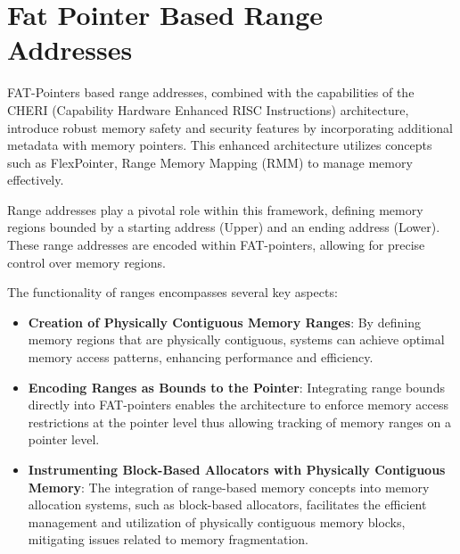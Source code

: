 \chapter{Fat Pointer Based Range Addresses}

\ifpdf
    \graphicspath{{Fat-Pointer-Based-Range-Address/Figs/Raster/}{Fat-Pointer-Based-Range-Address/Figs/PDF/}{Fat-Pointer-Based-Range-Address/Figs/}}
\else
    \graphicspath{{Fat-Pointer-Based-Range-Address/Figs/Vector/}{Fat-Pointer-Based-Range-Address/Figs/}}
\fi


FAT-Pointers based range addresses, combined with the capabilities of the CHERI (Capability Hardware Enhanced RISC Instructions) 
architecture, introduce robust memory safety and security features by incorporating additional metadata 
with memory pointers. This enhanced architecture utilizes concepts such as FlexPointer, 
Range Memory Mapping (RMM) to manage memory effectively.

Range addresses play a pivotal role within this framework, defining memory 
regions bounded by a starting address (Upper) and an ending address (Lower). 
These range addresses are encoded within FAT-pointers, allowing for precise 
control over memory regions.

The functionality of ranges encompasses several key aspects:
\begin{itemize}
\item \textbf{Creation of Physically Contiguous Memory Ranges}:
By defining memory regions that are physically contiguous, systems can 
achieve optimal memory access patterns, enhancing performance and efficiency.
\item \textbf{Encoding Ranges as Bounds to the Pointer}:
Integrating range bounds directly into FAT-pointers enables the architecture 
to enforce memory access restrictions at the pointer level thus allowing 
tracking of memory ranges on a pointer level.
\item \textbf{Instrumenting Block-Based Allocators with Physically Contiguous Memory}:
The integration of range-based memory concepts into memory allocation systems, such as block-based 
allocators, facilitates the efficient management and utilization of physically contiguous memory blocks, 
mitigating issues related to memory fragmentation.
\end{itemize}

